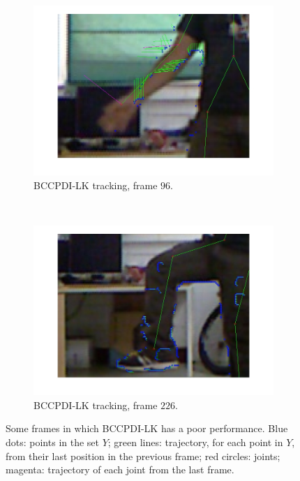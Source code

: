 \begin{figure}[h!]
        \begin{subfigure}[b]{0.45\textwidth}
                \centering
                \includegraphics[width=\textwidth, trim=0 0 0 0,clip]{fig32.jpg}
                \caption{BCCPDI-LK tracking, frame $96$.}
                \label{fig:cp02_comparison_oflow_fails_elbow_lk_side}
        \end{subfigure}%
        ~
        \begin{subfigure}[b]{0.45\textwidth}
                \centering
                \includegraphics[width=\textwidth, trim=0 0 0 0,clip]{fig33.jpg}
                \caption{BCCPDI-LK tracking, frame $226$.}
                \label{fig:cp02_comparison_oflow_fails_knee_lk_side}
        \end{subfigure}%

        \caption{Some frames in which BCCPDI-LK has a poor performance. Blue dots: points in the set $Y$; green lines: trajectory, for each point in $Y$, from their last position in the previous frame; red circles: joints;  magenta: trajectory of each joint from the last frame.}\label{fig:cp02_bccpdi_lk_fails}
\end{figure}

